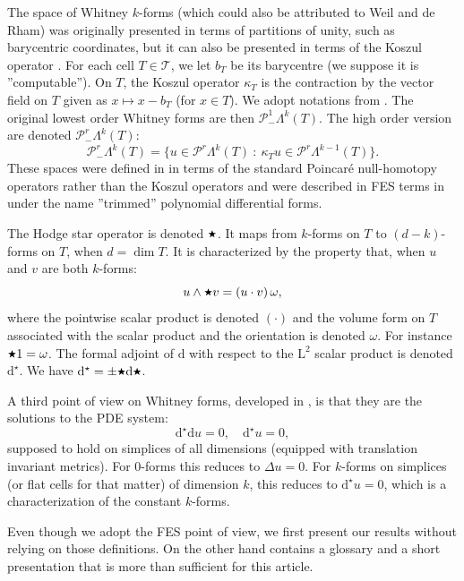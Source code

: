 \documentclass[10pt,a4paper]{article}
\newcommand{\rmd}{\mathrm{d}}
\newcommand{\rmL}{\mathrm{L}}
\newcommand{\calP}{\mathcal{P}}
\newcommand{\calT}{\mathcal{T}}
\newcommand{\hs}{\raisebox{1pt}{$\scriptstyle \bigstar$}}
\newcommand{\Poly}{\calP}
\newcommand{\Pminus}{\Poly_{\!\!-}}
\theoremstyle{remark}
\theoremstyle{definition}
\numberwithin{equation}{section}
\begin{document}
The space of Whitney $k$-forms (which could also be attributed to Weil and de Rham) was originally presented in terms of partitions of unity, such as barycentric coordinates, but it can also be presented in terms of the Koszul operator \cite[\S 3.2]{ArnFalWin06}. For each cell $T \in \calT$, we let $b_T$ be its barycentre (we suppose it is ''computable''). On $T$, the Koszul operator $\kappa_T$ is the contraction by the vector field on $T$ given as $x \mapsto x- b_T$ (for $x \in T$). We adopt notations from \cite{ArnFalWin06}. The original lowest order Whitney forms are then $\Pminus^1\Lambda^k(T)$. The high order version are denoted $\Pminus^r\Lambda^k(T)$:
\begin{equation}
\Pminus^r\Lambda^k(T) = \{ u \in \Poly^r \Lambda^k(T) \ : \ \kappa_T u \in \Poly^r \Lambda^{k-1} (T)\}.
\end{equation}
These spaces were defined in \cite{Hip99} in terms of the standard Poincaré null-homotopy operators rather than the Koszul operators and were described in FES terms in \cite{ChrRap16} under the name ''trimmed'' polynomial differential forms. 


The Hodge star operator is denoted $\hs$. It maps from $k$-forms on $T$ to $(d-k)$-forms on $T$, when $d = \dim T$. It is characterized by the property that, when $u$ and $v$ are both $k$-forms:
\begin{equation}
  u \wedge \hs v = (u \cdot v)\, \omega,
\end{equation}
where the pointwise scalar product is denoted $(\cdot)$ and the volume form on $T$ associated with the scalar product and the orientation is denoted $\omega$. For instance $\hs 1 = \omega$.
The formal adjoint of $\rmd$ with respect to the $\rmL^2$ scalar product is denoted $\rmd^\star$. We have $\rmd^\star = \pm \hs \rmd \hs$.

A third point of view on Whitney forms, developed in \cite{Chr08M3AS}, is that they are the solutions to the PDE system:
\begin{equation}
  \rmd^\star \rmd u = 0, \quad \rmd^\star u = 0,
\end{equation}
supposed to hold on simplices of all dimensions (equipped with translation invariant metrics). For $0$-forms this reduces to $\Delta u = 0$. For $k$-forms on simplices (or flat cells for that matter) of dimension $k$, this reduces to $\rmd^\star u= 0$, which is a characterization of the constant $k$-forms.

Even though we adopt the FES point of view, we first present our results without relying on those definitions. On the other hand \cite[\S 2]{ChrRap16} contains a glossary and a short presentation that is more than sufficient for this article.
\end{document}
